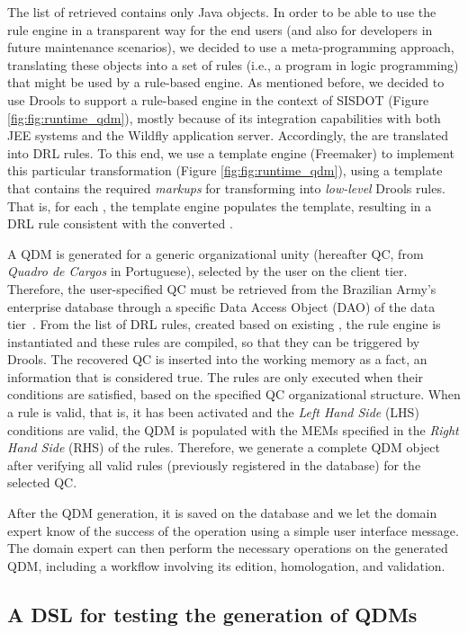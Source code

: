 The list of retrieved \callers contains only Java objects. 
In order to be able to use the rule engine in a transparent way for the end users 
(and also for developers in future maintenance scenarios), we decided to use a 
meta-programming approach, translating these objects into a set of rules (i.e., a program in 
logic programming) that might be used by a rule-based engine. As mentioned before,  
we decided to use Drools to support a rule-based engine in the context of 
SISDOT (Figure \ref{fig:fig:runtime_qdm}), mostly because of its integration capabilities 
with both JEE systems and the Wildfly application server. Accordingly,  
the \callers are translated into DRL rules. To this end, we use a template engine (Freemaker) 
to implement this particular transformation (Figure \ref{fig:fig:runtime_qdm}), using a template 
that contains the required \emph{markups} for transforming \shc into \emph{low-level} Drools 
rules. That is, for each \shc, the template engine populates the template, 
resulting in a DRL rule consistent with the converted \shc.


A QDM is generated for a generic organizational unity (hereafter QC, from \emph{Quadro de Cargos} in Portuguese), 
selected by the user on the client tier. 
Therefore, the user-specified QC must be retrieved from the Brazilian Army's enterprise database  
through a specific Data Access Object (DAO) of the data tier~\cite{alur2003}.
From the list of DRL rules, created based on existing \callers, the rule engine is instantiated and these rules are compiled, 
so that they can be triggered by Drools. The recovered QC is inserted into the working memory as a fact,  an 
information that is considered true. The rules are only executed when their conditions are satisfied, 
based on the specified QC organizational structure. When a rule is valid, that is, it has been activated 
and the \emph{Left Hand Side} (LHS) conditions are valid, 
the QDM is populated with the MEMs specified in the \emph{Right Hand Side} (RHS) of the rules. Therefore, we generate a 
complete QDM object after verifying all valid rules (previously registered in the database) for 
the selected QC. 


After the QDM generation, it is saved on the database and we let the domain expert know 
of the success of the operation using a simple user interface message. 
The domain expert can then perform the necessary operations on the generated QDM, including a workflow 
involving  its edition, homologation, and validation.  

\subsection{A DSL for testing the generation of QDMs}

